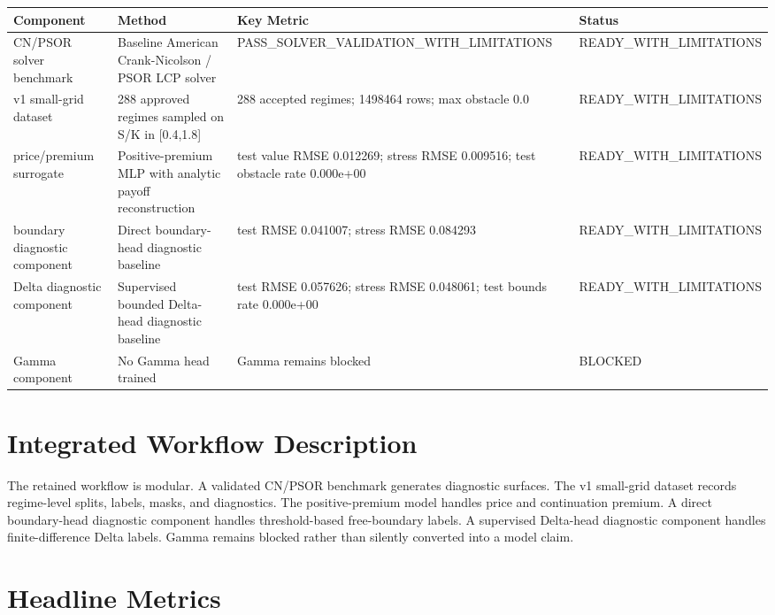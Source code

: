 \documentclass[11pt,a4paper]{article}
\begin{document}
\begin{longtable}{L{0.19\textwidth} L{0.24\textwidth} L{0.31\textwidth} L{0.16\textwidth}}
\toprule
Component & Method & Key Metric & Status \\
\midrule
\endhead
CN/PSOR solver benchmark & Baseline American Crank-Nicolson / PSOR LCP solver & PASS\_SOLVER\_VALIDATION\_WITH\_LIMITATIONS & READY\_WITH\_LIMITATIONS \\
v1 small-grid dataset & 288 approved regimes sampled on S/K in [0.4,1.8] & 288 accepted regimes; 1498464 rows; max obstacle 0.0 & READY\_WITH\_LIMITATIONS \\
price/premium surrogate & Positive-premium MLP with analytic payoff reconstruction & test value RMSE 0.012269; stress RMSE 0.009516; test obstacle rate 0.000e+00 & READY\_WITH\_LIMITATIONS \\
boundary diagnostic component & Direct boundary-head diagnostic baseline & test RMSE 0.041007; stress RMSE 0.084293 & READY\_WITH\_LIMITATIONS \\
Delta diagnostic component & Supervised bounded Delta-head diagnostic baseline & test RMSE 0.057626; stress RMSE 0.048061; test bounds rate 0.000e+00 & READY\_WITH\_LIMITATIONS \\
Gamma component & No Gamma head trained & Gamma remains blocked & BLOCKED \\
\bottomrule
\end{longtable}

\section{Integrated Workflow Description}

The retained workflow is modular. A validated CN/PSOR benchmark generates diagnostic surfaces.
The v1 small-grid dataset records regime-level splits, labels, masks, and diagnostics. The
positive-premium model handles price and continuation premium. A direct boundary-head diagnostic
component handles threshold-based free-boundary labels. A supervised Delta-head diagnostic
component handles finite-difference Delta labels. Gamma remains blocked rather than silently
converted into a model claim.

\section{Headline Metrics}
\end{document}
